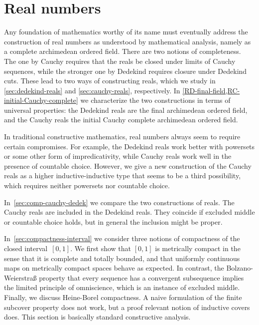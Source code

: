 \chapter{Real numbers}
\label{cha:real-numbers}

Any foundation of mathematics worthy of its name must eventually address the construction of real numbers as understood by mathematical analysis, namely as a complete archimedean ordered field.
%
There are two notions of completeness. The one by Cauchy requires that the reals be closed under limits of Cauchy sequences, while the stronger one by Dedekind requires closure under Dedekind cuts.
These lead to two ways of constructing reals, which we study in \autoref{sec:dedekind-reals} and \autoref{sec:cauchy-reals}, respectively. In \autoref{RD-final-field,RC-initial-Cauchy-complete} we characterize the two constructions in terms of universal properties: the Dedekind reals are the final archimedean ordered field, and the Cauchy reals the initial Cauchy complete archimedean ordered field.

In traditional constructive mathematics, real numbers always seem to require certain compromises. For example, the Dedekind reals work better with powersets or some other form of impredicativity, while Cauchy reals work well in the presence of countable choice.
%
However, we give a new construction of the Cauchy reals as a higher inductive-inductive type that seems to be a third possibility, which requires neither powersets nor countable choice.

In~\autoref{sec:comp-cauchy-dedek} we compare the two constructions of reals. The Cauchy reals are included in the Dedekind reals. They coincide if excluded middle or countable choice holds, but in general the inclusion might be proper.

In~\autoref{sec:compactness-interval} we consider three notions of compactness of the closed interval~$[0,1]$. We first show that $[0,1]$ is metrically compact in the sense that it is complete and totally bounded, and that uniformly continuous maps on metrically compact spaces behave as expected. In contrast, the Bolzano-Weierstra\ss{} property that every sequence has a convergent subsequence implies the limited principle of omniscience, which is an instance of excluded middle. Finally, we discuss Heine-Borel compactness. A naive formulation of the finite subcover property does not work, but a proof relevant notion of inductive covers does.
This section is basically standard constructive analysis.

